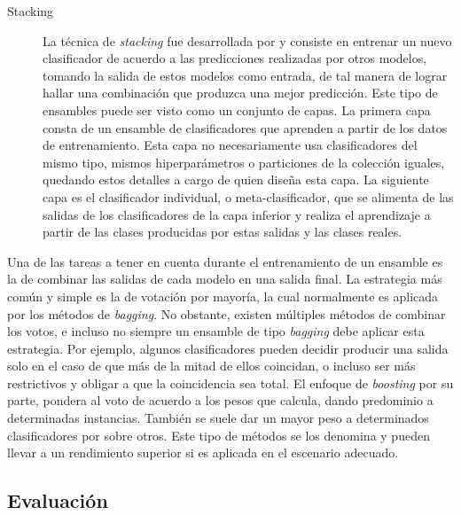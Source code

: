 \begin{description}
	\item[Stacking] La técnica de \textit{stacking} fue desarrollada por
	      \citeauthor{wolpert_stacked_1992}\cite{wolpert_stacked_1992} y consiste en
	      entrenar un nuevo clasificador de acuerdo a las predicciones realizadas
	      por otros modelos, tomando la salida de estos modelos como entrada, de tal
	      manera de lograr hallar una combinación que produzca una mejor predicción.
	      Este tipo de ensambles puede ser visto como un conjunto de capas. La
	      primera capa consta de un ensamble de clasificadores que aprenden a partir
	      de los datos de entrenamiento. Esta capa no necesariamente usa
	      clasificadores del mismo tipo, mismos hiperparámetros o particiones de la
	      colección iguales, quedando estos detalles a cargo de quien diseña esta
	      capa. La siguiente capa es el clasificador individual, o
	      meta-clasificador, que se alimenta de las salidas de los clasificadores de
	      la capa inferior y realiza el aprendizaje a partir de las clases
	      producidas por estas salidas y las clases reales.

\end{description}

Una de las tareas a tener en cuenta durante el entrenamiento de un ensamble es
la de combinar las salidas de cada modelo en una salida final. La estrategia más
común y simple es la de votación por mayoría, la cual normalmente es aplicada por los
métodos de \textit{bagging}. No obstante, existen múltiples métodos de combinar
los votos, e incluso no siempre un ensamble de tipo \textit{bagging} debe
aplicar esta estrategia. Por ejemplo, algunos clasificadores pueden decidir
producir una salida solo en el caso de que más de la mitad de ellos coincidan, o
incluso ser más restrictivos y obligar a que la coincidencia sea total. El
enfoque de \textit{boosting} por su parte, pondera al voto de acuerdo a los
pesos que calcula, dando predominio a determinadas instancias.  También se suele
dar un mayor peso a determinados clasificadores por sobre otros. Este tipo de
métodos se los denomina  y pueden llevar a
un rendimiento superior si es aplicada en el escenario adecuado.



\subsection{Evaluación}
\label{evaluacion_intro}

